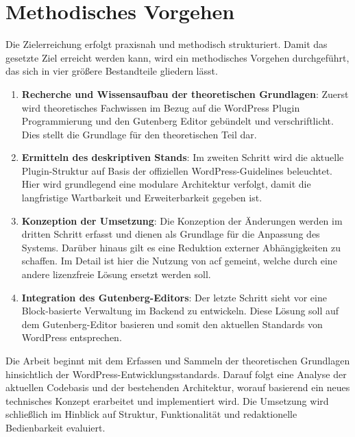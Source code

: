 \section{Methodisches Vorgehen}

Die Zielerreichung erfolgt praxisnah und methodisch strukturiert.
Damit das gesetzte Ziel erreicht werden kann, wird ein methodisches Vorgehen durchgeführt, das sich in vier größere Bestandteile gliedern lässt.

\begin{enumerate}
    \item \textbf{Recherche und Wissensaufbau der theoretischen Grundlagen}: Zuerst wird theoretisches Fachwissen im Bezug auf die WordPress Plugin Programmierung und den Gutenberg Editor gebündelt und verschriftlicht.
    Dies stellt die Grundlage für den theoretischen Teil dar.

    \item \textbf{Ermitteln des deskriptiven Stands}: Im zweiten Schritt wird die aktuelle Plugin-Struktur auf Basis der offiziellen WordPress-Guidelines beleuchtet.
    Hier wird grundlegend eine modulare Architektur verfolgt, damit die langfristige Wartbarkeit und Erweiterbarkeit gegeben ist.

    \item \textbf{Konzeption der Umsetzung}: Die Konzeption der Änderungen werden im dritten Schritt erfasst und dienen als Grundlage für die Anpassung des Systems.
    Darüber hinaus gilt es eine Reduktion externer Abhängigkeiten zu schaffen. Im Detail ist hier die Nutzung von \gls{acf} gemeint, welche durch eine andere lizenzfreie Lösung ersetzt werden soll.

    \item \textbf{Integration des Gutenberg-Editors}: Der letzte Schritt sieht vor eine Block-basierte Verwaltung im Backend zu entwickeln.
    Diese Lösung soll auf dem Gutenberg-Editor basieren und somit den aktuellen Standards von WordPress entsprechen.
\end{enumerate}

Die Arbeit beginnt mit dem Erfassen und Sammeln der theoretischen Grundlagen hinsichtlich der WordPress-Entwicklungsstandards.
Darauf folgt eine Analyse der aktuellen Codebasis und der bestehenden Architektur, worauf basierend ein neues technisches Konzept erarbeitet und implementiert wird.
Die Umsetzung wird schließlich im Hinblick auf Struktur, Funktionalität und redaktionelle Bedienbarkeit evaluiert.
